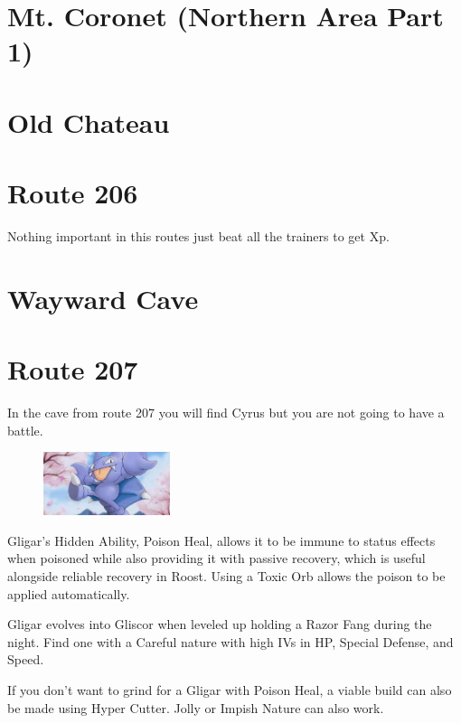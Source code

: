 \documentclass[11pt]{article}
\begin{document}
\section{Mt. Coronet (Northern Area Part 1)}\label{sec:Mt._Coronet_North}
% 

\section{Old Chateau}\label{sec:Old_Chateau}



\section{Route 206}\label{sec:Route_206}
Nothing important in this routes just beat all the trainers to get Xp.

\section{Wayward Cave}\label{sec:Wayward_Cave}



\section{Route 207}\label{sec:Route_207}
In the cave from route 207 you will find Cyrus but you are not going to have a battle.



\begin{mdframed}[style=MyFrame,nobreak=true,frametitle={Pokemon Spotlight: Gligar}]

\begin{figure}
\includegraphics[width=0.33\textwidth]{walkthrough/Sinnoh/spotlight-gligar}
\label{fig:spotlight-gligar}
\end{figure}

Gligar's Hidden Ability, Poison Heal, allows it to be immune to status effects
when poisoned while also providing it with passive recovery, which is useful
alongside reliable recovery in Roost.
Using a Toxic Orb allows the poison to be applied automatically.

Gligar evolves into Gliscor when leveled up holding a Razor Fang during the night.
Find one with a Careful nature with high IVs in HP, Special Defense, and Speed.

If you don't want to grind for a Gligar with Poison Heal, a viable build can
also be made using Hyper Cutter.
Jolly or Impish Nature can also work.

\end{mdframed}
\end{document}
